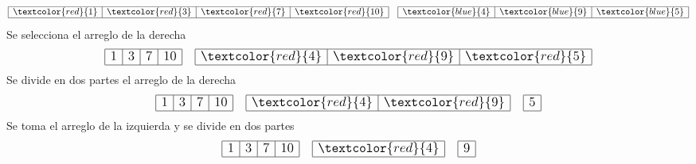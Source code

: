\documentclass{article}
\begin{document}
\begin{minipage}{0.5\textwidth}
\begin{equation*}
\begin{array}{|r|r|r|r|}
      \hline \textcolor{red}{1} & \textcolor{red}{3} & \textcolor{red}{7} & \textcolor{red}{10} \\ \hline
    \end{array}\quad 
    \begin{array}{|r|r|r|}
      \hline \textcolor{blue}{4} & \textcolor{blue}{9} & \textcolor{blue}{5} \\ \hline
    \end{array}
  \end{equation*}
  Se selecciona el arreglo de la derecha
  \begin{equation*}
    \large
    \begin{array}{|r|r|r|r|}
      \hline 1 & 3 & 7 & 10 \\ \hline
    \end{array}\quad 
    \begin{array}{|r|r|r|}
      \hline \textcolor{red}{4} & \textcolor{red}{9} & \textcolor{red}{5} \\ \hline
    \end{array}
  \end{equation*}
  Se divide en dos partes el arreglo de la derecha
  \begin{equation*}
    \large
    \begin{array}{|r|r|r|r|}
      \hline 1 & 3 & 7 & 10 \\ \hline
    \end{array}\quad 
    \begin{array}{|r|r|}
      \hline \textcolor{red}{4} & \textcolor{red}{9} \\ \hline
    \end{array}\quad 
    \begin{array}{|r|}
      \hline 5 \\ \hline
    \end{array}
  \end{equation*}
  Se toma el arreglo de la izquierda y se divide en dos partes
  \begin{equation*}
    \large
    \begin{array}{|r|r|r|r|}
      \hline 1 & 3 & 7 & 10 \\ \hline
    \end{array}\quad 
    \begin{array}{|r|}
      \hline \textcolor{red}{4} \\ \hline
    \end{array} \quad
    \begin{array}{|r|}
      \hline 9 \\ \hline

\end{array}
\end{equation*}
\end{minipage}
\end{document}
